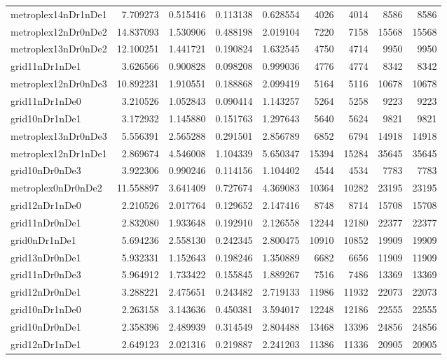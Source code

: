 \begin{longtable}{|l|r|r|r|r|r|r|r|r|}
metroplex14nDr1nDe1 & 7.709273 & 0.515416 & 0.113138 & 0.628554 & 4026 & 4014 & 8586 & 8586 \\
metroplex12nDr0nDe2 & 14.837093 & 1.530906 & 0.488198 & 2.019104 & 7220 & 7158 & 15568 & 15568 \\
metroplex13nDr0nDe2 & 12.100251 & 1.441721 & 0.190824 & 1.632545 & 4750 & 4714 & 9950 & 9950 \\
grid11nDr1nDe1 & 3.626566 & 0.900828 & 0.098208 & 0.999036 & 4776 & 4774 & 8342 & 8342 \\
metroplex12nDr0nDe3 & 10.892231 & 1.910551 & 0.188868 & 2.099419 & 5164 & 5116 & 10678 & 10678 \\
grid11nDr1nDe0 & 3.210526 & 1.052843 & 0.090414 & 1.143257 & 5264 & 5258 & 9223 & 9223 \\
grid10nDr1nDe1 & 3.172932 & 1.145880 & 0.151763 & 1.297643 & 5640 & 5624 & 9821 & 9821 \\
metroplex13nDr0nDe3 & 5.556391 & 2.565288 & 0.291501 & 2.856789 & 6852 & 6794 & 14918 & 14918 \\
metroplex12nDr1nDe1 & 2.869674 & 4.546008 & 1.104339 & 5.650347 & 15394 & 15284 & 35645 & 35645 \\
grid10nDr0nDe3 & 3.922306 & 0.990246 & 0.114156 & 1.104402 & 4544 & 4534 & 7783 & 7783 \\
metroplex0nDr0nDe2 & 11.558897 & 3.641409 & 0.727674 & 4.369083 & 10364 & 10282 & 23195 & 23195 \\
grid12nDr1nDe0 & 2.210526 & 2.017764 & 0.129652 & 2.147416 & 8748 & 8714 & 15708 & 15708 \\
grid11nDr0nDe1 & 2.832080 & 1.933648 & 0.192910 & 2.126558 & 12244 & 12180 & 22377 & 22377 \\
grid0nDr1nDe1 & 5.694236 & 2.558130 & 0.242345 & 2.800475 & 10910 & 10852 & 19909 & 19909 \\
grid13nDr0nDe1 & 5.932331 & 1.152643 & 0.198246 & 1.350889 & 6682 & 6656 & 11909 & 11909 \\
grid11nDr0nDe3 & 5.964912 & 1.733422 & 0.155845 & 1.889267 & 7516 & 7486 & 13369 & 13369 \\
grid12nDr0nDe1 & 3.288221 & 2.475651 & 0.243482 & 2.719133 & 11986 & 11932 & 22073 & 22073 \\
grid10nDr1nDe0 & 2.263158 & 3.143636 & 0.450381 & 3.594017 & 12248 & 12186 & 22555 & 22555 \\
grid10nDr0nDe1 & 2.358396 & 2.489939 & 0.314549 & 2.804488 & 13468 & 13396 & 24856 & 24856 \\
grid12nDr1nDe1 & 2.649123 & 2.021316 & 0.219887 & 2.241203 & 11386 & 11336 & 20905 & 20905 \\

\end{longtable}
